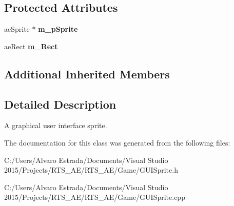 \subsection*{Protected Attributes}
\begin{DoxyCompactItemize}
\item 
ae\+Sprite $\ast$ {\bfseries m\+\_\+p\+Sprite}\hypertarget{classae_g_u_i_sprite_a68c442299ee5560144baba573e8a4d7f}{}\label{classae_g_u_i_sprite_a68c442299ee5560144baba573e8a4d7f}

\item 
ae\+Rect {\bfseries m\+\_\+\+Rect}\hypertarget{classae_g_u_i_sprite_a3d3215806d267a9663ed0e947c5041b1}{}\label{classae_g_u_i_sprite_a3d3215806d267a9663ed0e947c5041b1}

\end{DoxyCompactItemize}
\subsection*{Additional Inherited Members}


\subsection{Detailed Description}
A graphical user interface sprite. 

The documentation for this class was generated from the following files\+:\begin{DoxyCompactItemize}
\item 
C\+:/\+Users/\+Alvaro Estrada/\+Documents/\+Visual Studio 2015/\+Projects/\+R\+T\+S\+\_\+\+A\+E/\+R\+T\+S\+\_\+\+A\+E/\+Game/G\+U\+I\+Sprite.\+h\item 
C\+:/\+Users/\+Alvaro Estrada/\+Documents/\+Visual Studio 2015/\+Projects/\+R\+T\+S\+\_\+\+A\+E/\+R\+T\+S\+\_\+\+A\+E/\+Game/G\+U\+I\+Sprite.\+cpp\end{DoxyCompactItemize}
